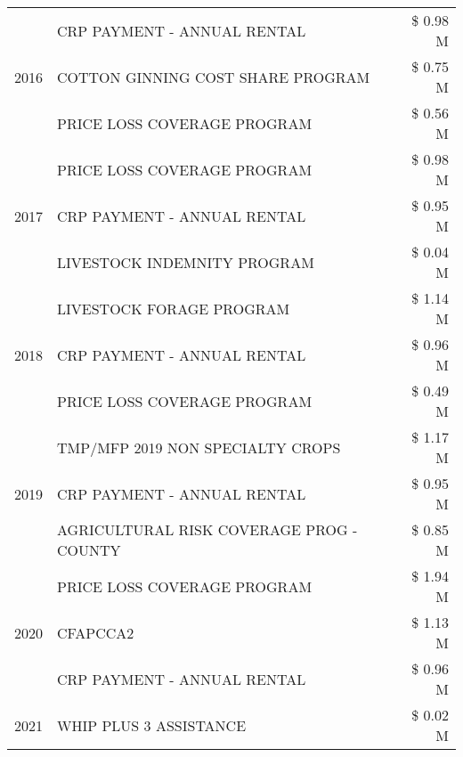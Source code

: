 \begin{tabular}{llr}
\cline{1-3}
\multirow[t]{3}{*}{2016} & CRP PAYMENT - ANNUAL RENTAL & \$ 0.98 M \\
 & COTTON GINNING COST SHARE PROGRAM & \$ 0.75 M \\
 & PRICE LOSS COVERAGE PROGRAM & \$ 0.56 M \\
\cline{1-3}
\multirow[t]{3}{*}{2017} & PRICE LOSS COVERAGE PROGRAM & \$ 0.98 M \\
 & CRP PAYMENT - ANNUAL RENTAL & \$ 0.95 M \\
 & LIVESTOCK INDEMNITY PROGRAM & \$ 0.04 M \\
\cline{1-3}
\multirow[t]{3}{*}{2018} & LIVESTOCK FORAGE PROGRAM & \$ 1.14 M \\
 & CRP PAYMENT - ANNUAL RENTAL & \$ 0.96 M \\
 & PRICE LOSS COVERAGE PROGRAM & \$ 0.49 M \\
\cline{1-3}
\multirow[t]{3}{*}{2019} & TMP/MFP 2019 NON SPECIALTY CROPS & \$ 1.17 M \\
 & CRP PAYMENT - ANNUAL RENTAL & \$ 0.95 M \\
 & AGRICULTURAL RISK COVERAGE PROG - COUNTY & \$ 0.85 M \\
\cline{1-3}
\multirow[t]{3}{*}{2020} & PRICE LOSS COVERAGE PROGRAM & \$ 1.94 M \\
 & CFAPCCA2 & \$ 1.13 M \\
 & CRP PAYMENT - ANNUAL RENTAL & \$ 0.96 M \\
\cline{1-3}
2021 & WHIP PLUS 3 ASSISTANCE & \$ 0.02 M \\
\cline{1-3}
\bottomrule
\end{tabular}
